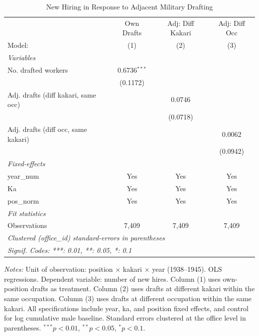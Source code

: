 \begin{table}[htbp]
\centering
\caption{New Hiring in Response to Adjacent Military Drafting}
\label{tab:reallocation-adjacent}
\begin{threeparttable}
\begin{tabular}{lccc}
   \tabularnewline \midrule \midrule
                                       & Own Drafts     & Adj: Diff Kakari & Adj: Diff Occ \\   
   Model:                              & (1)            & (2)              & (3)\\  
   \midrule
   \emph{Variables}\\
   No. drafted workers                 & 0.6736$^{***}$ &                  &   \\   
                                       & (0.1172)       &                  &   \\   
   Adj. drafts (diff kakari, same occ) &                & 0.0746           &   \\   
                                       &                & (0.0718)         &   \\   
   Adj. drafts (diff occ, same kakari) &                &                  & 0.0062\\   
                                       &                &                  & (0.0942)\\   
   \midrule
   \emph{Fixed-effects}\\
   year\_num                           & Yes            & Yes              & Yes\\  
   Ka                                  & Yes            & Yes              & Yes\\  
   pos\_norm                           & Yes            & Yes              & Yes\\  
   \midrule
   \emph{Fit statistics}\\
   Observations                        & 7,409          & 7,409            & 7,409\\  
   \midrule \midrule
   \multicolumn{4}{l}{\emph{Clustered (office\_id) standard-errors in parentheses}}\\
   \multicolumn{4}{l}{\emph{Signif. Codes: ***: 0.01, **: 0.05, *: 0.1}}\\
\end{tabular}
\begin{tablenotes}[flushleft]
\footnotesize
\item \textit{Notes:} Unit of observation: position $\times$ kakari $\times$ year (1938--1945). OLS regressions. Dependent variable: number of new hires. Column (1) uses own-position drafts as treatment. Column (2) uses drafts at different kakari within the same occupation. Column (3) uses drafts at different occupation within the same kakari. All specifications include year, ka, and position fixed effects, and control for log cumulative male baseline. Standard errors clustered at the office level in parentheses. $^{***}p<0.01$, $^{**}p<0.05$, $^{*}p<0.1$.
\end{tablenotes}
\end{threeparttable}
\end{table}
